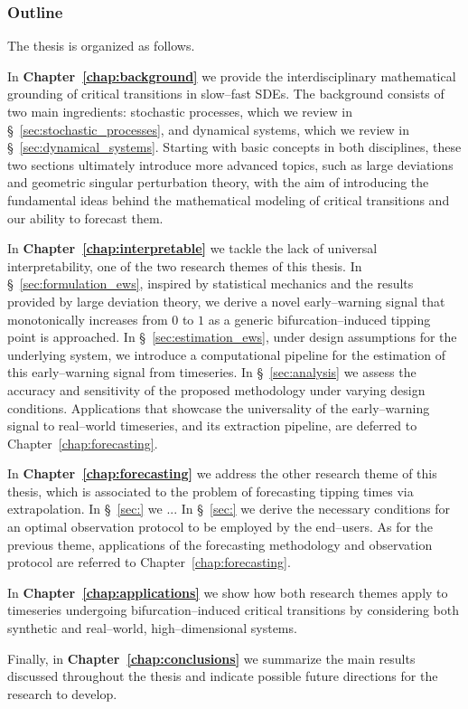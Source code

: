\subsubsection{Outline}
The thesis is organized as follows.

In \textbf{Chapter~\ref{chap:background}} we provide the interdisciplinary mathematical grounding of critical transitions in slow--fast SDEs. 
The background consists of two main ingredients: stochastic processes, which we review in \S~\ref{sec:stochastic_processes}, and dynamical systems, which we review in \S~\ref{sec:dynamical_systems}.
Starting with basic concepts in both disciplines, these two sections ultimately introduce more advanced topics, such as large deviations and geometric singular perturbation theory, with the aim of introducing the fundamental ideas behind the mathematical modeling of critical transitions and our ability to forecast them.

In \textbf{Chapter~\ref{chap:interpretable}} we tackle the lack of universal interpretability, one of the two research themes of this thesis. 
In \S~\ref{sec:formulation_ews}, inspired by statistical mechanics and the results provided by large deviation theory, we derive a novel early--warning signal that monotonically increases from $0$ to $1$ as a generic bifurcation--induced tipping point is approached.
In \S~\ref{sec:estimation_ews}, under design assumptions for the underlying system, we introduce a computational pipeline for the estimation of this early--warning signal from timeseries.
In \S~\ref{sec:analysis} we assess the accuracy and sensitivity of the proposed methodology under varying design conditions.
Applications that showcase the universality of the early--warning signal to real--world timeseries, and its extraction pipeline, are deferred to Chapter~\ref{chap:forecasting}.

In \textbf{Chapter~\ref{chap:forecasting}} we address the other research theme of this thesis, which is associated to the problem of forecasting tipping times via extrapolation. 
In \S~\ref{sec:} we ...
In \S~\ref{sec:} we derive the necessary conditions for an optimal observation protocol to be employed by the end--users.
As for the previous theme, applications of the forecasting methodology and observation protocol are referred to Chapter~\ref{chap:forecasting}.

In \textbf{Chapter~\ref{chap:applications}} we show how both research themes apply to timeseries undergoing bifurcation--induced critical transitions by considering both synthetic and real--world, high--dimensional systems.

Finally, in \textbf{Chapter~\ref{chap:conclusions}} we summarize the main results discussed throughout the thesis and indicate possible future directions for the research to develop.
